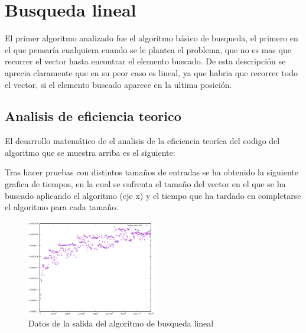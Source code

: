 \section{Busqueda lineal}

El primer algoritmo analizado fue el algoritmo básico de busqueda, el primero en el que pensaría cualquiera cuando se le plantea el problema, que no es mas que recorrer el vector hasta encontrar el elemento buscado. De esta descripción se aprecia claramente que en su peor caso es lineal, ya que habria que recorrer todo el vector, si el elemento buscado aparece en la ultima posición.

\subsection{Analisis de eficiencia teorico}


El desarrollo matemático de el analisis de la eficiencia teoríca del codigo del algoritmo que se muestra arriba es el siguiente:


Tras hacer pruebas con distintos tamaños de entradas se ha obtenido la siguiente grafica de tiempos, en la cual se enfrenta el tamaño del vector en el que se ha buscado aplicando el algoritmo (eje x) y el tiempo que ha tardado en completarse el algoritmo para cada tamaño.

\begin{figure}[h]
  \includegraphics[width=0.5\textwidth]{./Imagenes/binaria_data.png}
  \caption{Datos de la salida del algoritmo de busqueda lineal}
\end{figure}
